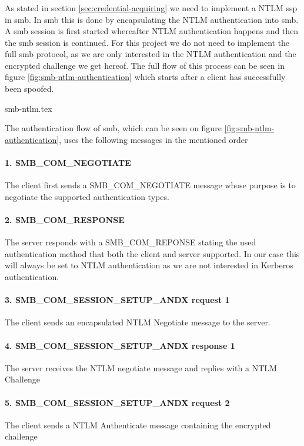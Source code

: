 \documentclass{article}
\begin{document}
\subsubsection{}
As stated in section \ref{sec:credential-acquiring} we need to implement a NTLM \gls{ssp} in \gls{smb}. In \gls{smb} this is done by encapsulating the NTLM authentication into \gls{smb}.
A \gls{smb} session is first started whereafter NTLM authentication happens and then the \gls{smb} session is continued. For this project we do not need to implement the full \gls{smb} protocol, as we are only interested in the NTLM authentication and the encrypted challenge we get hereof. The full flow of this process can be seen in figure \ref{fig:smb-ntlm-authentication} which starts after a client has successfully been spoofed.

{smb-ntlm.tex}

The authentication flow of \gls{smb}, which can be seen on figure \ref{fig:smb-ntlm-authentication}, uses the following messages in the mentioned order
\paragraph{1. SMB\_COM\_NEGOTIATE} The client first sends a SMB\_COM\_NEGOTIATE message whose purpose is to negotiate the supported authentication types.
\paragraph{2. SMB\_COM\_RESPONSE} The server responds with a SMB\_COM\_REPONSE stating the used authentication method that both the client and server supported. In our case this will always be set to NTLM authentication as we are not interested in Kerberos authentication.
\paragraph{3. SMB\_COM\_SESSION\_SETUP\_ANDX request 1} The client sends an encapsulated NTLM Negotiate message to the server.
\paragraph{4. SMB\_COM\_SESSION\_SETUP\_ANDX response 1} The server receives the NTLM negotiate message and replies with a NTLM Challenge
\paragraph{5. SMB\_COM\_SESSION\_SETUP\_ANDX request 2} The client sends a NTLM Authenticate message containing the encrypted challenge
\end{document}
